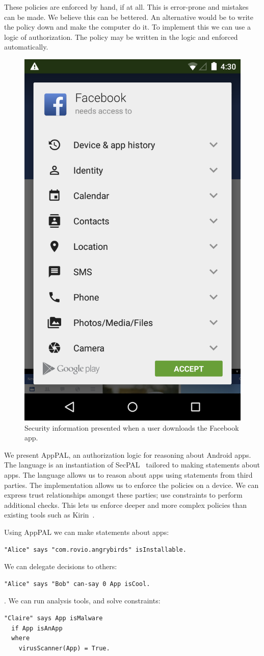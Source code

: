 \documentclass[a4paper]{scrartcl}
\newcommand{\comment}[1]{}%
\begin{document}
These policies are enforced by hand, if at all.
This is error-prone and mistakes can be made.
We believe this can be bettered.
An alternative would be to write the policy down and make the computer do it.
To implement this we can use a logic of authorization.
The policy may be written in the logic and enforced automatically.

\begin{figure}
  \centering
  \includegraphics[width=0.3\linewidth]{figures/facebook.png}
  \caption{Security information presented when a user downloads the Facebook app.}
\label{fig:facebook}
\end{figure}

We present AppPAL, an authorization logic for reasoning about Android apps.
The language is an instantiation of SecPAL~\citep{Becker:2006vh} tailored to making statements about apps.
The language allows us to reason about apps using statements from third parties.
The implementation allows us to enforce the policies on a device.
We can express trust relationships amongst these parties; use constraints to perform additional checks.
This lets us enforce deeper and more complex policies than existing tools such as Kirin~\citep{Enck:2009ko}.

Using AppPAL we can make statements about apps:
\begin{lstlisting}
"Alice" says "com.rovio.angrybirds" isInstallable.
\end{lstlisting}
We can delegate decisions to others:
\begin{lstlisting}
"Alice" says "Bob" can-say 0 App isCool.
\end{lstlisting}.
We can run analysis tools, and solve constraints:
\begin{lstlisting}
"Claire" says App isMalware
  if App isAnApp
  where
    virusScanner(App) = True.
\end{lstlisting}
\end{document}
